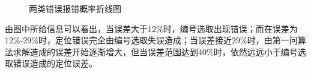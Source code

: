 \documentclass{ctexart}
\begin{document}
\begin{figure}[H]
  \center
  
  \hspace{-20pt}%
  \caption{两类错误报错概率折线图}
  \label{两类错误报错概率折线图}
  \end{figure}

  由图中所给信息可以看出，当误差大于12\%时，编号选取出现错误；而在误差为12\%-29\%时，定位错误完全由编号选取失误造成；当误差接近29\%时，由第一问算法求解造成的误差开始逐渐增大，但当误差范围达到40\%时，依然远远小于编号选取错误造成的定位误差。
\end{document}

